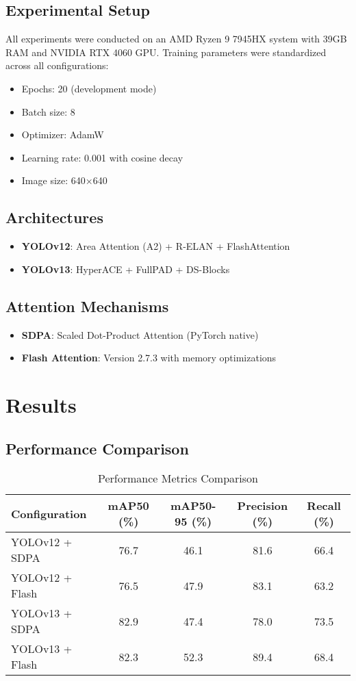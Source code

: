 \documentclass[11pt,a4paper]{article}
\begin{document}
\subsection{Experimental Setup}
All experiments were conducted on an AMD Ryzen 9 7945HX system with 39GB RAM and NVIDIA RTX 4060 GPU. Training parameters were standardized across all configurations:
\begin{itemize}
    \item Epochs: 20 (development mode)
    \item Batch size: 8
    \item Optimizer: AdamW
    \item Learning rate: 0.001 with cosine decay
    \item Image size: 640×640
\end{itemize}

\subsection{Architectures}
\begin{itemize}
    \item \textbf{YOLOv12}: Area Attention (A2) + R-ELAN + FlashAttention
    \item \textbf{YOLOv13}: HyperACE + FullPAD + DS-Blocks
\end{itemize}

\subsection{Attention Mechanisms}
\begin{itemize}
    \item \textbf{SDPA}: Scaled Dot-Product Attention (PyTorch native)
    \item \textbf{Flash Attention}: Version 2.7.3 with memory optimizations
\end{itemize}

\section{Results}

\subsection{Performance Comparison}
\begin{table}[H]
\centering
\caption{Performance Metrics Comparison}
\begin{tabular}{lcccc}
\toprule
Configuration & mAP50 (\%) & mAP50-95 (\%) & Precision (\%) & Recall (\%) \\
\midrule
YOLOv12 + SDPA & 76.7 & 46.1 & 81.6 & 66.4 \\
YOLOv12 + Flash & 76.5 & 47.9 & 83.1 & 63.2 \\
YOLOv13 + SDPA & 82.9 & 47.4 & 78.0 & 73.5 \\
YOLOv13 + Flash & 82.3 & 52.3 & 89.4 & 68.4 \\
\bottomrule
\end{tabular}
\end{table}
\end{document}
